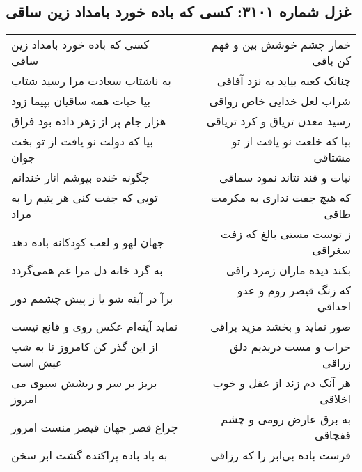 \begin{center}
\section*{غزل شماره ۳۱۰۱: کسی که باده خورد بامداد زین ساقی}
\label{sec:3101}
\begin{longtable}{l p{0.5cm} r}
کسی که باده خورد بامداد زین ساقی
&&
خمار چشم خوشش بین و فهم کن باقی
\\
به ناشتاب سعادت مرا رسید شتاب
&&
چنانک کعبه بیاید به نزد آفاقی
\\
بیا حیات همه ساقیان بپیما زود
&&
شراب لعل خدایی خاص رواقی
\\
هزار جام پر از زهر داده بود فراق
&&
رسید معدن تریاق و کرد تریاقی
\\
بیا که دولت نو یافت از تو بخت جوان
&&
بیا که خلعت نو یافت از تو مشتاقی
\\
چگونه خنده بپوشم انار خندانم
&&
نبات و قند نتاند نمود سماقی
\\
تویی که جفت کنی هر یتیم را به مراد
&&
که هیچ جفت نداری به مکرمت طاقی
\\
جهان لهو و لعب کودکانه باده دهد
&&
ز توست مستی بالغ که زفت سغراقی
\\
به گرد خانه دل مرا غم همی‌گردد
&&
بکند دیده ماران زمرد راقی
\\
برآ در آینه شو یا ز پیش چشمم دور
&&
که زنگ قیصر روم و عدو احداقی
\\
نماید آینه‌ام عکس روی و قانع نیست
&&
صور نماید و بخشد مزید براقی
\\
از این گذر کن کامروز تا به شب عیش است
&&
خراب و مست دریدیم دلق زراقی
\\
بریز بر سر و ریشش سبوی می امروز
&&
هر آنک دم زند از عقل و خوب اخلاقی
\\
چراغ قصر جهان قیصر منست امروز
&&
به برق عارض رومی و چشم قفچاقی
\\
به باد باده پراکنده گشت ابر سخن
&&
فرست باده بی‌ابر را که رزاقی
\\
\end{longtable}
\end{center}
